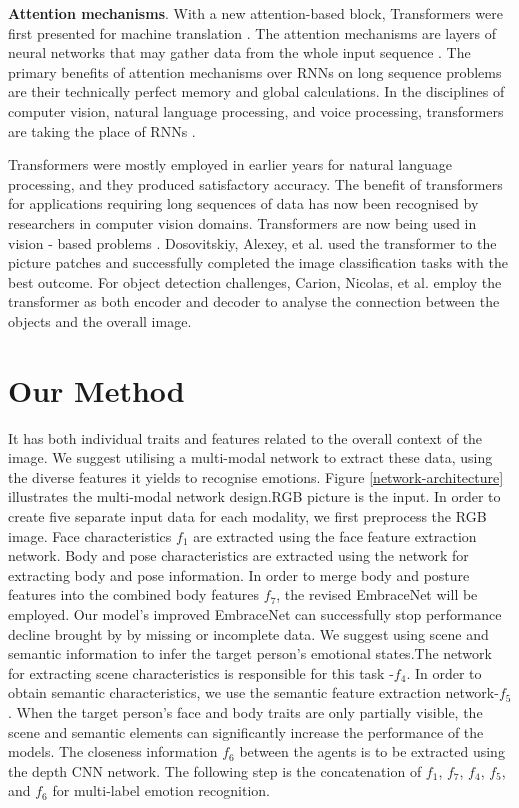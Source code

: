 \documentclass[conference]{IEEEtran}
\begin{document}
\textbf{Attention mechanisms}. With a new attention-based block, Transformers were first presented for machine translation \cite{ref-46}. The attention mechanisms are layers of neural networks that may gather data from the whole input sequence \cite{ref-53}. The primary benefits of attention mechanisms over RNNs on long sequence problems are their technically perfect memory and global calculations. In the disciplines of computer vision, natural language processing, and voice processing, transformers are taking the place of RNNs \cite{ref-54}. 

Transformers were mostly employed in earlier years for natural language processing, and they produced satisfactory accuracy. The benefit of transformers for applications requiring long sequences of data has now been recognised by researchers in computer vision domains. Transformers are now being used in vision - based problems \cite{ref-57}. Dosovitskiy, Alexey, et al.  \cite{ref-29} used the transformer to the picture patches and successfully completed the image classification tasks with the best outcome. For object detection challenges, Carion, Nicolas, et al. \cite{ref-51}  employ the transformer as both encoder and decoder to analyse the connection between the objects and the overall image.

\section{Our Method}
It has both individual traits and features related to the overall context of the image. We suggest utilising a multi-modal network to extract these data, using the diverse features it yields to recognise emotions. Figure  \ref{network-architecture} illustrates the multi-modal network design.RGB picture is the input. In order to create five separate input data for each modality, we first preprocess the RGB image. Face characteristics $f_1$ are extracted using the face feature extraction network. Body and pose characteristics are extracted using the network for extracting body and pose information. In order to merge body and posture features into the combined body features $f_7$, the revised EmbraceNet \cite{ref-41}  will be employed. Our model's improved EmbraceNet can successfully stop performance decline brought by by missing or incomplete data. We suggest using scene and semantic information to infer the target person's emotional states.The network for extracting scene characteristics is responsible for this task -$f_4$. In order to obtain semantic characteristics, we use the semantic feature extraction network-$f_5$. When the target person's face and body traits are only partially visible, the scene and semantic elements can significantly increase the performance of the models. The closeness information $f_6$ between the agents is to be extracted using the depth CNN network. The following step is the concatenation of $f_1$, $f_7$, $f_4$, $f_5$, and $f_6$ for multi-label emotion recognition.
\end{document}
